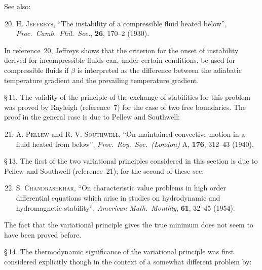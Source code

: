 \noindent See also:

\begin{enumerate}
\setcounter{enumi}{19}

\item \textsc{H. Jeffreys}, ``The instability of a compressible fluid heated below'',
  \textit{Proc.\ Camb.\ Phil.\ Soc.}, \textbf{26}, 170--2 (1930).

\end{enumerate}

\noindent In reference~20, Jeffreys shows that the criterion for the onset of instability
derived for incompressible fluids can, under certain conditions, be used for
compressible fluids if $\beta$ is interpreted as the difference between the adiabatic
temperature gradient and the prevailing temperature gradient.

\noindent \S\,11. The validity of the principle of the exchange of stabilities for this problem
was proved by Rayleigh (reference~7) for the case of two free boundaries. The
proof in the general case is due to Pellew and Southwell:

\begin{enumerate}
\setcounter{enumi}{20}

\item \textsc{A. Pellew} and \textsc{R. V. Southwell}, ``On maintained convective motion in
  a fluid heated from below'', \textit{Proc.\ Roy.\ Soc.\ (London)} A, \textbf{176},
  312--43 (1940).

\end{enumerate}

\noindent \S\,13. The first of the two variational principles considered in this section is due
to Pellew and Southwell (reference~21); for the second of these see:

\begin{enumerate}
\setcounter{enumi}{21}

\item \textsc{S. Chandrasekhar}, ``On characteristic value problems in high order
  differential equations which arise in studies on hydrodynamic and hydromagnetic
  stability'', \textit{American Math.\ Monthly}, \textbf{61}, 32--45 (1954).

\end{enumerate}

\noindent The fact that the variational principle gives the true minimum does not seem to
have been proved before.

\noindent \S\,14. The thermodynamic significance of the variational principle was first
considered explicitly though in the context of a somewhat different problem by:

